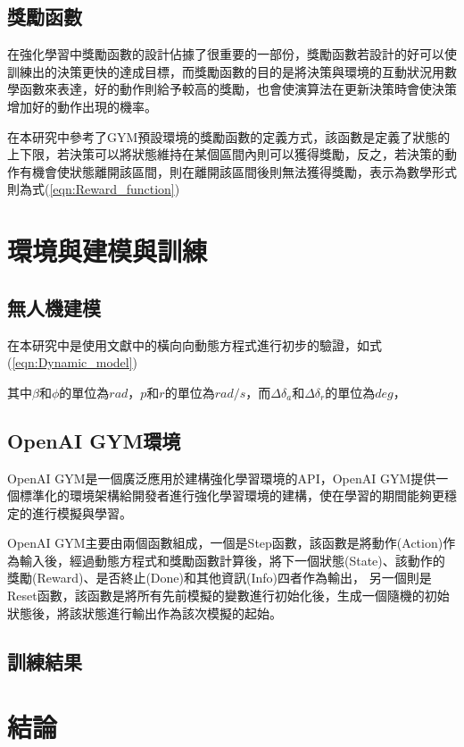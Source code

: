 \documentclass[a4paper, onecolumn, 11pt, AutoFakeBold]{article}
\newcommand{\texttwelve}{\fontsize{12}{12}\selectfont}
\renewcommand{\eqref}[1]{式(\ref{#1})}
\begin{document}
\begin{multicols*}{2}
\smallskip
\subsection{獎勵函數}
\par
在強化學習中獎勵函數的設計佔據了很重要的一部份，獎勵函數若設計的好可以使訓練出的決策更快的達成目標，而獎勵函數的目的是將決策與環境的互動狀況用數學函數來表達，好的動作則給予較高的獎勵，也會使演算法在更新決策時會使決策增加好的動作出現的機率。
\par
在本研究中參考了GYM預設環境的獎勵函數的定義方式，該函數是定義了狀態的上下限，若決策可以將狀態維持在某個區間內則可以獲得獎勵，反之，若決策的動作有機會使狀態離開該區間，則在離開該區間後則無法獲得獎勵，表示為數學形式則為\eqref{eqn:Reward_function}

\noindent

\smallskip
\section{環境與建模與訓練}
\subsection{無人機建模}
在本研究中是使用文獻\cite{Optimal_Sliding_Mode_Controller_for_Fixed-wing_UAV}中的橫向向動態方程式進行初步的驗證，如\eqref{eqn:Dynamic_model}

\noindent 其中$\beta$和$\phi$的單位為$rad$，$p$和$r$的單位為$rad/s$，而$\Delta \delta_a$和$\Delta \delta_r$的單位為$deg$，

\subsection{OpenAI GYM環境}
\par
OpenAI GYM是一個廣泛應用於建構強化學習環境的API，OpenAI GYM提供一個標準化的環境架構給開發者進行強化學習環境的建構，使在學習的期間能夠更穩定的進行模擬與學習。
\par
OpenAI GYM主要由兩個函數組成，一個是Step函數，該函數是將動作(Action)作為輸入後，經過動態方程式和獎勵函數計算後，將下一個狀態(State)、該動作的獎勵(Reward)、是否終止(Done)和其他資訊(Info)四者作為輸出，
\noindent 另一個則是Reset函數，該函數是將所有先前模擬的變數進行初始化後，生成一個隨機的初始狀態後，將該狀態進行輸出作為該次模擬的起始。

\smallskip
\subsection{訓練結果}

\smallskip
\section{結論}

\smallskip
\titleformat{\section}{\bfseries\texttwelve}{}{0em}{}
\printbibliography[title={參考文獻}]

\end{multicols*}
\end{document}
